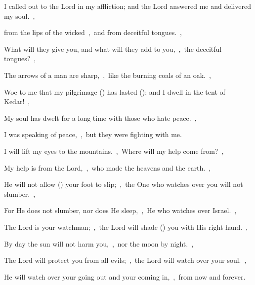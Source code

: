 \documentclass[12pt,twoside,a5paper]{article}
\begin{document}
\begin{normalparskip}
  I called out to the Lord in my affliction; and the Lord answered me and delivered my soul.~\sep


  from the lips of the wicked~\sep\ and from deceitful tongues.~\sep

  What will they give you, and what will they add to you,~\sep\ the deceitful tongues?~\sep

  The arrows of a man are sharp,~\sep\ like the burning coals of an oak.~\sep

  Woe to me that my pilgrimage () has lasted (); and I dwell in the tent of Kedar!~\sep

  My soul has dwelt for a long time with those who hate peace.~\sep

  I was speaking of peace,~\sep\ but they were fighting with me.
\end{normalparskip}


\begin{normalparskip}
  I will lift my eyes to the mountains.~\sep\ Where will my help come from?~\sep


  My help is from the Lord,~\sep\ who made the heavens and the earth.~\sep

  He will not allow () your foot to slip;~\sep\ the One who watches over you will not slumber.~\sep

  For He does not slumber, nor does He sleep,~\sep\ He who watches over Israel.~\sep

  The Lord is your watchman;~\sep\ the Lord will shade () you with His right hand.~\sep

  By day the sun will not harm you,~\sep\ nor the moon by night.~\sep

  The Lord will protect you from all evils;~\sep\ the Lord will watch over your soul.~\sep

  He will watch over your going out and your coming in,~\sep\ from now and forever.
\end{normalparskip}

\end{document}
